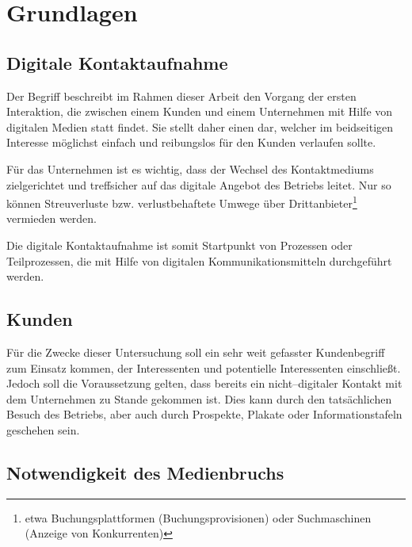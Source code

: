 
\section{Grundlagen} %
\label{sec:grundlagen}

\subsection{Digitale Kontaktaufnahme} %
\label{sub:digitale_kontaktaufnahme}

Der Begriff  beschreibt im Rahmen dieser Arbeit den Vorgang der ersten Interaktion, die zwischen einem Kunden und einem Unternehmen mit Hilfe von digitalen Medien statt findet. Sie stellt daher einen  dar, welcher im beidseitigen Interesse möglichst einfach und reibungslos für den Kunden verlaufen sollte. 

Für das Unternehmen ist es wichtig, dass der Wechsel des Kontaktmediums zielgerichtet und treffsicher auf das digitale Angebot des Betriebs leitet. Nur so können Streuverluste bzw. verlustbehaftete Umwege über Drittanbieter\footnote{etwa Buchungsplattformen (Buchungsprovisionen) oder Suchmaschinen (Anzeige von Konkurrenten)} vermieden werden.

Die digitale Kontaktaufnahme ist somit Startpunkt von Prozessen oder Teilprozessen, die mit Hilfe von digitalen Kommunikationsmitteln durchgeführt werden.

\subsection{Kunden} %
\label{sub:kunden}

Für die Zwecke dieser Untersuchung soll ein sehr weit gefasster Kundenbegriff zum Einsatz kommen, der Interessenten und potentielle Interessenten einschließt. Jedoch soll die Voraussetzung gelten, dass bereits ein nicht--digitaler Kontakt mit dem Unternehmen zu Stande gekommen ist. Dies kann durch den tatsächlichen Besuch des Betriebs, aber auch durch Prospekte, Plakate oder Informationstafeln geschehen sein.

\subsection{Notwendigkeit des Medienbruchs} %
\label{sec:medienbruch}


